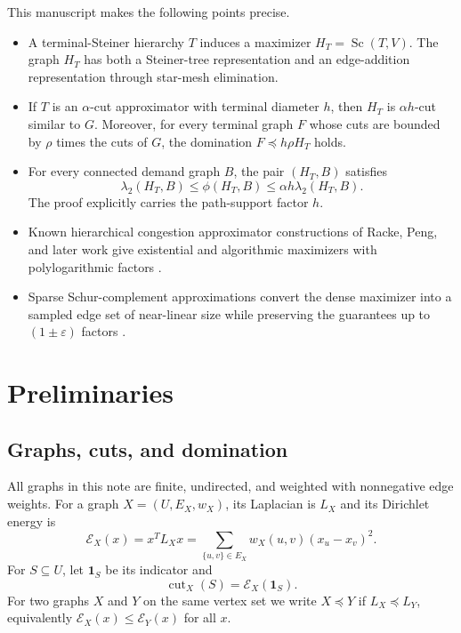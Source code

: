 \documentclass[11pt]{article}
\newcommand{\cut}{\operatorname{cut}}
\newcommand{\Sc}{\operatorname{Sc}}
\newcommand{\E}{\mathcal{E}}
\begin{document}
This manuscript makes the following points precise.

\begin{itemize}
\item A terminal-Steiner hierarchy $T$ induces a maximizer
$H_T=\Sc(T,V)$.  The graph $H_T$ has both a Steiner-tree representation and
an edge-addition representation through star-mesh elimination.
\item If $T$ is an $\alpha$-cut approximator with terminal diameter $h$, then
$H_T$ is $\alpha h$-cut similar to $G$.  Moreover, for every terminal graph
$F$ whose cuts are bounded by $\rho$ times the cuts of $G$, the domination
$F \preceq h\rho H_T$ holds.
\item For every connected demand graph $B$, the pair $(H_T,B)$ satisfies
\[
  \lambda_2(H_T,B) \le \phi(H_T,B)
  \le \alpha h \lambda_2(H_T,B).
\]
The proof explicitly carries the path-support factor $h$.
\item Known hierarchical congestion approximator constructions of Racke,
Peng, and later work give existential and algorithmic maximizers with
polylogarithmic factors \cite{racke2002minimizing,racke2008optimal,
racke2014computing,peng2016approximate,henzinger2025improved,
li2025bottomup,agarwal2024parallel}.
\item Sparse Schur-complement approximations convert the dense maximizer into
a sampled edge set of near-linear size while preserving the guarantees up to
$(1\pm\varepsilon)$ factors \cite{lee2015sparsified,li2018spectral}.
\end{itemize}

\section{Preliminaries}

\subsection{Graphs, cuts, and domination}

All graphs in this note are finite, undirected, and weighted with nonnegative
edge weights.  For a graph $X=(U,E_X,w_X)$, its Laplacian is $L_X$ and its
Dirichlet energy is
\[
  \E_X(x)=x^T L_X x
  =\sum_{\{u,v\}\in E_X} w_X(u,v)(x_u-x_v)^2 .
\]
For $S\subseteq U$, let $\mathbf{1}_S$ be its indicator and
\[
  \cut_X(S)=\E_X(\mathbf{1}_S).
\]
For two graphs $X$ and $Y$ on the same vertex set we write
$X\preceq Y$ if $L_X\preceq L_Y$, equivalently
$\E_X(x)\le \E_Y(x)$ for all $x$.
\end{document}
